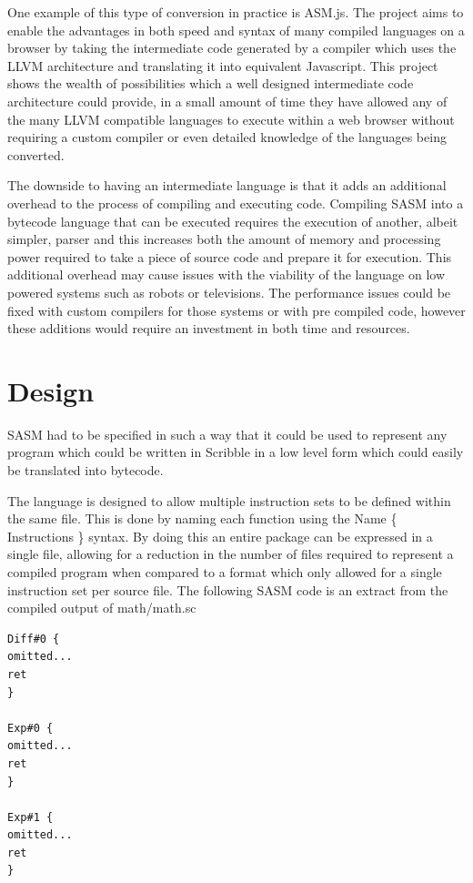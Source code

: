 \documentclass[]{final_report}
\begin{document}
One example of this type of conversion in practice is ASM.js. The project aims to enable the advantages in both speed and syntax of many compiled languages on a browser by taking the intermediate code generated by a compiler which uses the LLVM architecture and translating it into equivalent Javascript\cite{ASMJSSPEC}. This project shows the wealth of possibilities which a well designed intermediate code architecture could provide, in a small amount of time they have allowed any of the many LLVM compatible languages to execute within a web browser without requiring a custom compiler or even detailed knowledge of the languages being converted.

The downside to having an intermediate language is that it adds an additional overhead to the process of compiling and executing code. Compiling SASM into a bytecode language that can be executed requires the execution of another, albeit simpler, parser and this increases both the amount of memory and processing power required to take a piece of source code and prepare it for execution. This additional overhead may cause issues with the viability of the language on low powered systems such as robots or televisions. The performance issues could be fixed with custom compilers for those systems or with pre compiled code, however these additions would require an investment in both time and resources.

\section{Design}

SASM had to be specified in such a way that it could be used to represent any program which could be written in Scribble in a low level form which could easily be translated into bytecode.

The language is designed to allow multiple instruction sets to be defined within the same file. This is done by naming each function using the Name \{ Instructions \} syntax. By doing this an entire package can be expressed in a single file, allowing for a reduction in the number of files required to represent a compiled program when compared to a format which only allowed for a single instruction set per source file. The following SASM code is an extract from the compiled output of math/math.sc

\begin{verbatim}
Diff#0 {
omitted...
ret
}

Exp#0 {
omitted...
ret
}

Exp#1 {
omitted...
ret
}
\end{verbatim}
\end{document}
